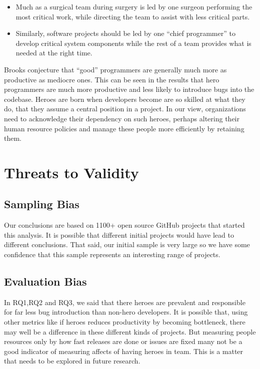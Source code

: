 \documentclass[sigconf,review]{acmart}
\begin{document}
\begin{itemize}
  \item  Much as a surgical team during surgery is led by one surgeon performing the most critical work, while directing the team to assist with less critical parts.
  
  \item Similarly, software projects should be led by one ``chief programmer'' to  develop critical system components while the rest of a team provides what is needed at the right time.
\end{itemize}
Brooks conjecture that ``good'' programmers are generally much more as productive as mediocre ones. This can be seen in the results that hero programmers are much more productive and less likely to introduce bugs into the codebase.
Heroes are born when developers become are so skilled at what they do, that  they assume a central position in a project.
In our view,  organizations need to acknowledge their dependency on such heroes, perhaps altering their human resource policies and manage these people more efficiently by retaining them.

\section{Threats to Validity}
\label{sec:Threats to Validity}
  \subsection{Sampling Bias} Our conclusions are based on 1100+ open source GitHub projects that started this analysis.  It is possible that   different initial projects would have lead to different conclusions. That said, our initial sample is very large so we have some confidence that this sample represents an interesting range of projects.  
            
     \subsection{Evaluation Bias} In  RQ1,RQ2 and RQ3, we said that there heroes are prevalent and responsible for far less bug introduction than non-hero developers.
     It is possible that, using other metrics like if heroes reduces productivity by becoming bottleneck, there may well be a difference in these different kinds of projects. But measuring people resources only by how fast releases are done or issues are fixed many not be a good indicator of measuring affects of having heroes in team. This is a matter that needs to be explored in future research. 
\end{document}
